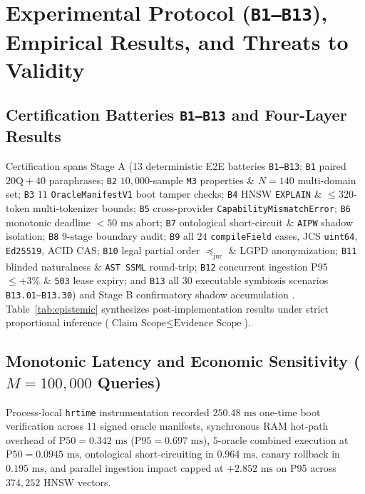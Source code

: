 \documentclass[10pt,twocolumn]{article}
\begin{document}
\section{Experimental Protocol (\texttt{B1--B13}), Empirical Results, and Threats to Validity}

\subsection{Certification Batteries \texttt{B1--B13} and Four-Layer Results}

Certification spans Stage A ($13$ deterministic E2E batteries \texttt{B1--B13}: \texttt{B1} paired $20\text{Q}+40$ paraphrases; \texttt{B2} $10{,}000$-sample \texttt{M3} properties \& $N=140$ multi-domain set; \texttt{B3} $11$ \texttt{OracleManifestV1} boot tamper checks; \texttt{B4} HNSW \texttt{EXPLAIN} \& $\le 320$-token multi-tokenizer bounds; \texttt{B5} cross-provider \texttt{CapabilityMismatchError}; \texttt{B6} monotonic deadline $<50\text{ ms}$ abort; \texttt{B7} ontological short-circuit \& \texttt{AIPW} shadow isolation; \texttt{B8} 9-stage boundary audit; \texttt{B9} all $24$ \texttt{compileField} cases, JCS \texttt{uint64}, \texttt{Ed25519}, ACID CAS; \texttt{B10} legal partial order $\preceq_{\mathrm{jur}}$ \& LGPD anonymization; \texttt{B11} blinded naturalness \& \texttt{AST SSML} round-trip; \texttt{B12} concurrent ingestion P95 $\le +3\%$ \& \texttt{503} lease expiry; and \texttt{B13} all $30$ executable symbiosis scenarios \texttt{B13.01--B13.30}) and Stage B confirmatory shadow accumulation \cite{howard2021time}. Table~\ref{tab:epistemic} synthesizes post-implementation results under strict proportional inference ($\text{Claim Scope} \le \text{Evidence Scope}$).

\subsection{Monotonic Latency and Economic Sensitivity ($M = 100{,}000$ Queries)}

Process-local \texttt{hrtime} instrumentation recorded $250.48\text{ ms}$ one-time boot verification across $11$ signed oracle manifests, synchronous RAM hot-path overhead of $\mathrm{P50}=0.342\text{ ms}$ ($\mathrm{P95}=0.697\text{ ms}$), $5$-oracle combined execution at $\mathrm{P50}=0.0945\text{ ms}$, ontological short-circuiting in $0.964\text{ ms}$, canary rollback in $0.195\text{ ms}$, and parallel ingestion impact capped at $+2.852\text{ ms}$ on P95 across $374{,}252$ HNSW vectors.
\end{document}
